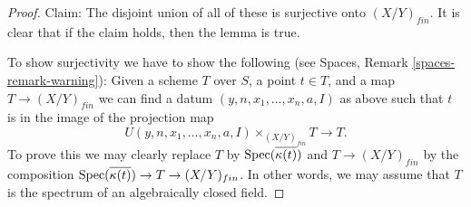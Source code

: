 \begin{proof}
\medskip\noindent
Claim: The disjoint union of all of these is surjective onto $(X/Y)_{fin}$.
It is clear that if the claim holds, then the lemma is true.

\medskip\noindent
To show surjectivity we have to show the following (see
Spaces, Remark \ref{spaces-remark-warning}): Given a scheme $T$ over
$S$, a point $t \in T$, and a map $T \to (X/Y)_{fin}$ we can find a datum
$(y, n, x_1, \ldots, x_n, a, I)$ as above such that
$t$ is in the image of the projection map
$$
U(y, n, x_1, \ldots, x_n, a, I) \times_{(X/Y)_{fin}} T \longrightarrow T.
$$
To prove this we may clearly replace $T$ by
$\operatorname{Spec}(\overline{\kappa(t)})$ and
$T \to (X/Y)_{fin}$ by the composition
$\operatorname{Spec}(\overline{\kappa(t)}) \to T \to (X/Y)_{fin}$.
In other words, we may assume that $T$ is
the spectrum of an algebraically closed field.


\end{proof}
